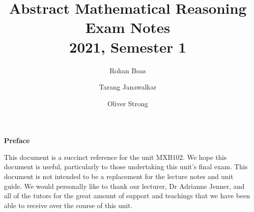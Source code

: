 \documentclass{article}
\title{\textbf{Abstract Mathematical Reasoning}
    \texorpdfstring{\\}{ } {\large Exam Notes}
    \texorpdfstring{\\}{ } {\normalsize 2021, Semester 1}}
\author{
    Rohan Boas \and Tarang Janawalkar \and Oliver Strong
}
\date{}
\theoremstyle{plain}
\numberwithin{theorem}{subsection}
\theoremstyle{definition}
\numberwithin{definition}{subsection}
\theoremstyle{remark}
\numberwithin{note}{subsection}
\begin{document}
\begin{titlepage}
\maketitle
\thispagestyle{empty}
\vfill
\begin{adjustwidth}{4cm}{4cm}
{\Large\bf Preface}
\vspace{0.7em}

This document is a succinct reference for the unit MXB102.
We hope this document is useful, particularly to those undertaking this unit's final exam.
This document is not intended to be a replacement for the lecture notes and unit guide.
We would personally like to thank our lecturer, Dr Adrianne Jenner,
and all of the tutors for the great amount of support and teachings
that we have been able to receive over the course of this unit.
\end{adjustwidth}
\vfill
\begin{adjustwidth}{5cm}{5cm}
\doclicenseThis
\end{adjustwidth}
\vfill
\end{titlepage}

\newpage
\end{document}
